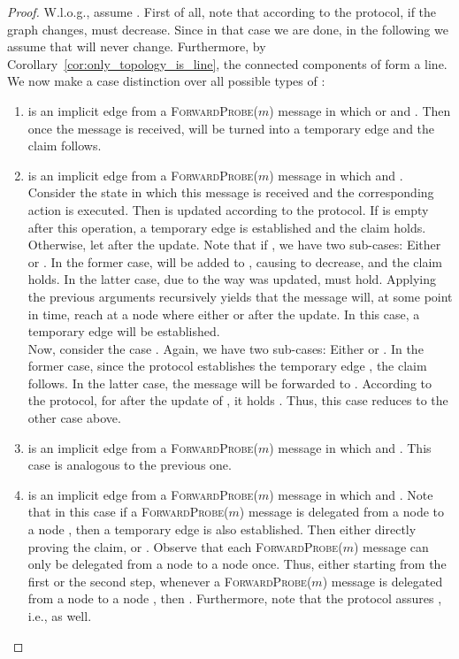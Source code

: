 \documentclass[a4paper,USenglish]{lipics}
\newcommand{\forwardprobe}[1]{\textsc{ForwardProbe(\ensuremath{#1})}\xspace}
\begin{document}
 \begin{proof}
W.l.o.g., assume .
First of all, note that according to the protocol, if the graph  changes,  must decrease.
Since in that case we are done, in the following we assume that  will never change.
Furthermore, by Corollary~\ref{cor:only_topology_is_line}, the connected components of  form a line.
We now make a case distinction over all possible types of :
 \begin{enumerate}
  \item  is an implicit edge from a \forwardprobe{m} message in which  or  and . 
	Then once the message is received,  will be turned into a temporary edge and the claim follows.
   \item  is an implicit edge from a \forwardprobe{m} message in which  and .    
	Consider the state in which this message is received and the corresponding action is executed.
	Then  is updated according to the protocol.
	If  is empty after this operation, a temporary edge  is established and the claim holds.	
	Otherwise, let  after the update.
	Note that if , we have two sub-cases: Either  or .
	In the former case,  will be added to , causing  to decrease, and the claim holds.
	In the latter case, due to the way  was updated,  must hold.
	Applying the previous arguments recursively yields that the message will, at some point in time, reach at a node  where either  or  after the update.
	In this case, a temporary edge  will be established.
	\\
	Now, consider the case .
	Again, we have two sub-cases: Either  or .
	In the former case, since the protocol establishes the temporary edge , the claim follows.
	In the latter case, the message will be forwarded to .
	According to the protocol, for  after the update of , it holds . Thus, this case reduces to the other case above.
  \item  is an implicit edge from a \forwardprobe{m} message in which  and .    
	This case is analogous to the previous one.
  \item  is an implicit edge from a \forwardprobe{m} message in which  and .    	
	Note that in this case if a \forwardprobe{m} message is delegated from a node  to a node , then a temporary edge  is also established.
	Then either  directly proving the claim, or .
	Observe that each \forwardprobe{m} message can only be delegated from a node  to a node  once.
	Thus, either starting from the first or the second step, whenever a \forwardprobe{m} message is delegated from a node  to a node , then .
	Furthermore, note that the protocol assures , i.e.,  as well.

\end{enumerate}
\end{proof}
\end{document}
